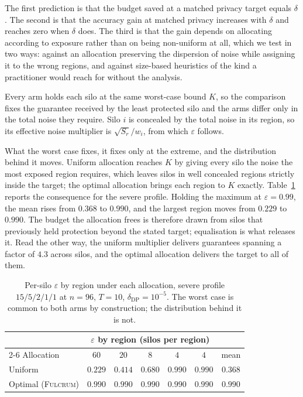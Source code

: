 \documentclass[acmsmall,screen,review,anonymous]{acmart}
\theoremstyle{acmdefinition}%
\newcommand{\Fulcrum}{\textsc{Fulcrum}\xspace}
\begin{document}
The first prediction is that the budget saved at a matched privacy target equals
$\delta$. The second is that the accuracy gain at matched privacy increases with
$\delta$ and reaches zero when $\delta$ does. The third is that the gain depends on
allocating according to exposure rather than on being non-uniform at all, which we
test in two ways: against an allocation preserving the dispersion of noise while
assigning it to the wrong regions, and against size-based heuristics of the kind a
practitioner would reach for without the analysis.

Every arm holds each silo at the same worst-case bound $K$, so the comparison fixes
the guarantee received by the least protected silo and the arms differ only in the
total noise they require. Silo $i$ is concealed by the total noise in its region,
so its effective noise multiplier is $\sqrt{S_r}/w_i$, from which $\varepsilon$
follows.

What the worst case fixes, it fixes only at the extreme, and the distribution
behind it moves. Uniform allocation reaches $K$ by giving every silo the noise the
most exposed region requires, which leaves silos in well concealed regions
strictly inside the target; the optimal allocation brings each region to $K$
exactly. Table~\ref{tab:epsdist} reports the consequence for the severe profile.
Holding the maximum at $\varepsilon = 0.99$, the mean rises from $0.368$ to
$0.990$, and the largest region moves from $0.229$ to $0.990$. The budget the
allocation frees is therefore drawn from silos that previously held protection
beyond the stated target; equalisation is what releases it. Read the other
way, the uniform multiplier delivers guarantees spanning a factor of $4.3$ across
silos, and the optimal allocation delivers the target to all of them.

\begin{table}[t]
\caption{Per-silo $\varepsilon$ by region under each allocation, severe profile $15/5/2/1/1$ at $n = 96$, $T = 10$, $\delta_{\mathrm{DP}} = 10^{-5}$. The worst case is common to both arms by construction; the distribution behind it is not.}
\label{tab:epsdist}
\centering
\footnotesize
\setlength{\tabcolsep}{4pt}
\begin{tabular}{@{}lcccccc@{}}
\toprule
& \multicolumn{5}{c}{$\varepsilon$ by region (silos per region)} & \\
\cmidrule(lr){2-6}
Allocation & $60$ & $20$ & $8$ & $4$ & $4$ & mean \\
\midrule
Uniform            & $0.229$ & $0.414$ & $0.680$ & $0.990$ & $0.990$ & $0.368$ \\
Optimal (\Fulcrum) & $0.990$ & $0.990$ & $0.990$ & $0.990$ & $0.990$ & $0.990$ \\
\bottomrule
\end{tabular}
\end{table}
\end{document}
